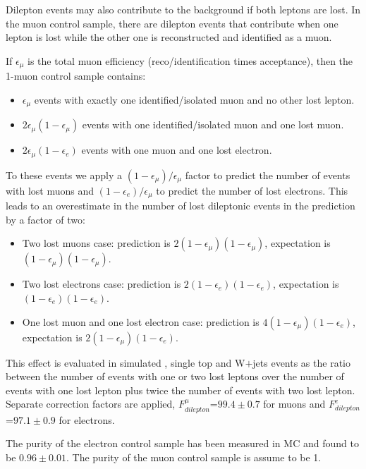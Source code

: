 Dilepton events may also contribute to the background if both leptons are lost.%
In the muon control sample, there are dilepton events that contribute 
when one lepton is lost while the other one is reconstructed and
identified as a muon.

If $\epsilon_{\mu}$ is the total muon efficiency 
(reco/identification times acceptance), then the 1-muon control sample contains:
\begin{itemize}
\item $\epsilon_{\mu}$ events with exactly one identified/isolated muon and 
no other lost lepton.
\item $2\epsilon_{\mu}(1-\epsilon_{\mu})$ events with one identified/isolated 
muon and one lost muon.
\item $2\epsilon_{\mu}(1-\epsilon_{e})$ events with one muon and one 
lost electron.
\end{itemize}
To these events we apply a $(1-\epsilon_{\mu})/\epsilon_{\mu}$ factor to
predict the number of events with  
lost muons and  $(1-\epsilon_{e})/\epsilon_{\mu}$ to predict the
number of lost electrons.
This leads to an overestimate in the number of lost dileptonic events in the 
prediction by a factor of two:
\begin{itemize}
\item Two lost muons case: prediction is 
$2(1-\epsilon_{\mu})(1-\epsilon_{\mu})$, expectation 
is $(1-\epsilon_{\mu})(1-\epsilon_{\mu})$.
\item Two lost electrons case: prediction is 
$2(1-\epsilon_{e})(1-\epsilon_{e})$, 
expectation is $(1-\epsilon_{e})(1-\epsilon_{e})$.
\item One lost muon and one lost electron case: prediction is
$4(1-\epsilon_{\mu})(1-\epsilon_{e})$, 
expectation is $2(1-\epsilon_{\mu})(1-\epsilon_{e})$.
\end{itemize}
This effect is evaluated in  
simulated \ttbar, single top and W$+$jets events as the ratio between the number of events 
with one or two lost leptons over the number of events with one lost 
lepton plus twice the number of events with two lost lepton. 
Separate correction factors are applied,  
$F_{dilepton}^{\mu}$=$99.4\pm0.7$ for muons and 
$F_{dilepton}^{e}$=$97.1\pm0.9$ for electrons.

The purity of the electron control sample has been measured in MC and found to be $0.96\pm0.01$. The purity of the muon control sample is assume to be 1.


